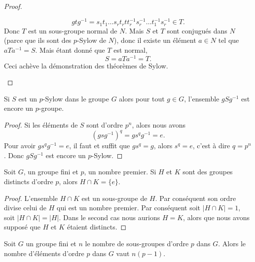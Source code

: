 \begin{proof}
\begin{enumerate}
            \begin{equation}
                gtg^{-1}=s_1t_1\ldots s_rt_rtt_r^{-1}s_r^{-1}\ldots t_1^{-1}s_r^{-1}\in T.
            \end{equation}
            Donc \( T\) est un sous-groupe normal de \( N\). Mais \( S\) et \( T\) sont conjugués dans \( N\) (parce que ils sont des $p$-Sylow de \( N\)), donc il existe un élément \( a\in N\) tel que \( aTa^{-1}=S\). Mais étant donné que \( T\) est normal,
            \begin{equation}
                S=aTa^{-1}=T.
            \end{equation}
            Ceci achève la démonstration des théorèmes de Sylow.

    \end{enumerate}
\end{proof}

\begin{proposition}
    Si \( S\) est un \( p\)-Sylow dans le groupe \( G\) alors pour tout \( g\in G\), l'ensemble \( gSg^{-1}\) est encore un \( p\)-groupe.    
\end{proposition}

\begin{proof}
    Si les éléments de \( S\) sont d'ordre \( p^n\), alors nous avons
    \begin{equation}
        (gsg^{-1})^q=gs^qg^{-1}=e.
    \end{equation}
    Pour avoir \( gs^qg^{-1}=e\), il faut et suffit que \( gs^q=g\), alors \( s^q=e\), c'est à dire \( q=p^n\). Donc \( gSg^{-1}\) est encore un \( p\)-Sylow.
\end{proof}

\begin{lemma}\label{Lemcmbzum}
    Soit \( G\), un groupe fini et \( p\), un nombre premier. Si \( H\) et \( K\) sont des groupes distincts d'ordre \( p\), alors \( H\cap K=\{ e \}\).
\end{lemma}

\begin{proof}
    L'ensemble \( H\cap K\) est un sous-groupe de \( H\). Par conséquent son ordre divise celui de \( H\) qui est un nombre premier. Par conséquent soit \( | H\cap K |=1\), soit \( | H\cap K |=| H |\). Dans le second cas nous aurions \( H=K\), alors que nous avons supposé que \( H\) et \( K\) étaient distincts.
\end{proof}

\begin{proposition} \label{PropyfhTmf}
    Soit \( G\) un groupe fini et \( n\) le nombre de sous-groupes d'ordre \( p\) dans \( G\). Alors le nombre d'éléments d'ordre \( p\) dans \( G\) vaut \( n(p-1)\).
\end{proposition}

